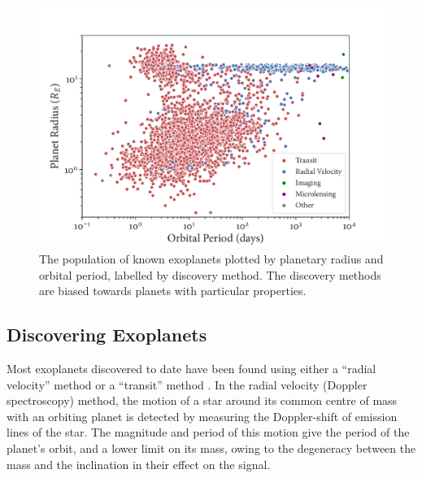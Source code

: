 
\begin{figure}
  \centering
    \includegraphics[width=1.0\textwidth]{figures/lit-review/planet-population.pdf}
    \caption{The population of known exoplanets plotted by planetary radius and orbital period, labelled by discovery method. The discovery methods are biased towards planets with particular properties.}\label{fig:review-planet-population}
\end{figure}


\subsection{Discovering Exoplanets}

Most exoplanets discovered to date have been found using either a ``radial velocity'' method or a ``transit'' method \citep{perryman2018exoplanet}. In the radial velocity (Doppler spectroscopy) method, the motion of a star around its common centre of mass with an orbiting planet is detected by measuring the Doppler-shift of emission lines of the star. The magnitude and period of this motion give the period of the planet's orbit, and a lower limit on its mass, owing to the degeneracy between the mass and the inclination in their effect on the signal.

